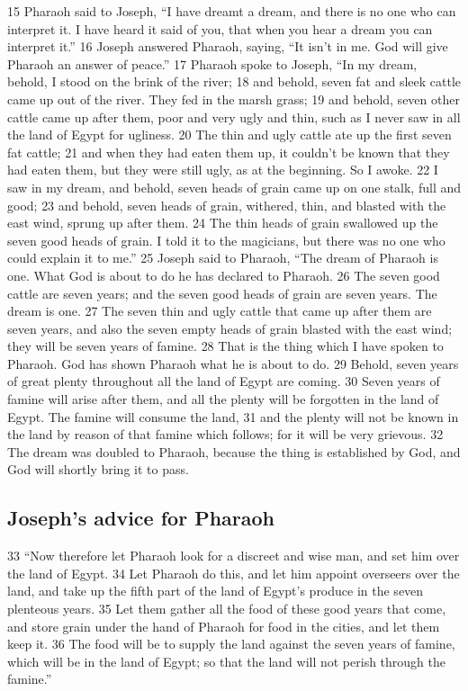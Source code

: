 {15} Pharaoh said to Joseph, ``I have dreamt a dream, and there is no
one who can interpret it. I have heard it said of you, that when you
hear a dream you can interpret it.'' {16} Joseph answered Pharaoh,
saying, ``It isn't in me. God will give Pharaoh an answer of peace.''
{17} Pharaoh spoke to Joseph, ``In my dream, behold, I stood on the
brink of the river; {18} and behold, seven fat and sleek cattle came up
out of the river. They fed in the marsh grass; {19} and behold, seven
other cattle came up after them, poor and very ugly and thin, such as I
never saw in all the land of Egypt for ugliness. {20} The thin and ugly
cattle ate up the first seven fat cattle; {21} and when they had eaten
them up, it couldn't be known that they had eaten them, but they were
still ugly, as at the beginning. So I awoke. {22} I saw in my dream, and
behold, seven heads of grain came up on one stalk, full and good; {23}
and behold, seven heads of grain, withered, thin, and blasted with the
east wind, sprung up after them. {24} The thin heads of grain swallowed
up the seven good heads of grain. I told it to the magicians, but there
was no one who could explain it to me.'' {25} Joseph said to Pharaoh,
``The dream of Pharaoh is one. What God is about to do he has declared
to Pharaoh. {26} The seven good cattle are seven years; and the seven
good heads of grain are seven years. The dream is one. {27} The seven
thin and ugly cattle that came up after them are seven years, and also
the seven empty heads of grain blasted with the east wind; they will be
seven years of famine. {28} That is the thing which I have spoken to
Pharaoh. God has shown Pharaoh what he is about to do. {29} Behold,
seven years of great plenty throughout all the land of Egypt are coming.
{30} Seven years of famine will arise after them, and all the plenty
will be forgotten in the land of Egypt. The famine will consume the
land, {31} and the plenty will not be known in the land by reason of
that famine which follows; for it will be very grievous. {32} The dream
was doubled to Pharaoh, because the thing is established by God, and God
will shortly bring it to pass.

\hypertarget{josephs-advice-for-pharaoh}{%
\subsection{Joseph's advice for
Pharaoh}\label{josephs-advice-for-pharaoh}}

{33} ``Now therefore let Pharaoh look for a discreet and wise man, and
set him over the land of Egypt. {34} Let Pharaoh do this, and let him
appoint overseers over the land, and take up the fifth part of the land
of Egypt's produce in the seven plenteous years. {35} Let them gather
all the food of these good years that come, and store grain under the
hand of Pharaoh for food in the cities, and let them keep it. {36} The
food will be to supply the land against the seven years of famine, which
will be in the land of Egypt; so that the land will not perish through
the famine.''

